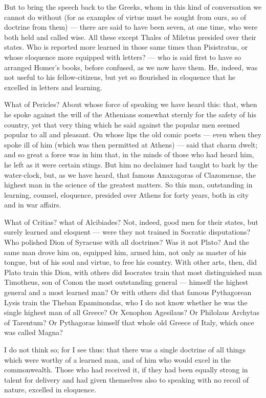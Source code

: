  But to bring the speech back to the Greeks, whom in this kind of conversation we cannot do without (for as examples of virtue must be sought from ours, so of doctrine from them) — there are said to have been seven, at one time, who were both held and called wise. All these except Thales of Miletus presided over their states. Who is reported more learned in those same times than Pisistratus, or whose eloquence more equipped with letters? — who is said first to have so arranged Homer's books, before confused, as we now have them. He, indeed, was not useful to his fellow-citizens, but yet so flourished in eloquence that he excelled in letters and learning.

 What of Pericles? About whose force of speaking we have heard this: that, when he spoke against the will of the Athenians somewhat sternly for the safety of his country, yet that very thing which he said against the popular men seemed popular to all and pleasant. On whose lips the old comic poets — even when they spoke ill of him (which was then permitted at Athens) — said that charm dwelt; and so great a force was in him that, in the minds of those who had heard him, he left as it were certain stings. But him no declaimer had taught to bark by the water-clock, but, as we have heard, that famous Anaxagoras of Clazomenae, the highest man in the science of the greatest matters. So this man, outstanding in learning, counsel, eloquence, presided over Athens for forty years, both in city and in war affairs.

 What of Critias? what of Alcibiades? Not, indeed, good men for their states, but surely learned and eloquent — were they not trained in Socratic disputations? Who polished Dion of Syracuse with all doctrines? Was it not Plato? And the same man drove him on, equipped him, armed him, not only as master of his tongue, but of his soul and virtue, to free his country. With other arts, then, did Plato train this Dion, with others did Isocrates train that most distinguished man Timotheus, son of Conon the most outstanding general — himself the highest general and a most learned man? Or with others did that famous Pythagorean Lysis train the Theban Epaminondas, who I do not know whether he was the single highest man of all Greece? Or Xenophon Agesilaus? Or Philolaus Archytas of Tarentum? Or Pythagoras himself that whole old Greece of Italy, which once was called Magna?

 I do not think so; for I see thus: that there was a single doctrine of all things which were worthy of a learned man, and of him who would excel in the commonwealth. Those who had received it, if they had been equally strong in talent for delivery and had given themselves also to speaking with no recoil of nature, excelled in eloquence.

